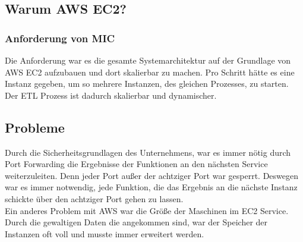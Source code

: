 \subsection{Warum AWS EC2?}
\subsubsection{Anforderung von MIC}
Die Anforderung war es die gesamte Systemarchitektur auf der Grundlage von AWS EC2 aufzubauen und dort skalierbar zu machen. Pro Schritt hätte es eine Instanz gegeben, um so mehrere Instanzen, des gleichen Prozesses, zu starten. Der ETL Prozess ist dadurch skalierbar und dynamischer.
\subsection{Probleme}
Durch die Sicherheitsgrundlagen des Unternehmens, war es immer nötig durch Port Forwarding die Ergebnisse der Funktionen an den nächsten Service weiterzuleiten. Denn jeder Port außer der achtziger Port war gesperrt. Deswegen war es immer notwendig, jede Funktion, die das Ergebnis an die nächste Instanz schickte über den achtziger Port gehen zu lassen.\\
Ein anderes Problem mit AWS war die Größe der Maschinen im EC2 Service. Durch die gewaltigen Daten die angekommen sind, war der Speicher der Instanzen oft voll und musste immer erweitert werden. 